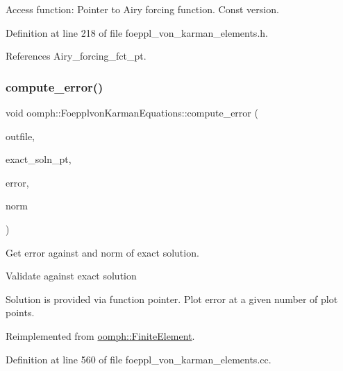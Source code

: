 Access function\+: Pointer to Airy forcing function. Const version. 



Definition at line 218 of file foeppl\+\_\+von\+\_\+karman\+\_\+elements.\+h.



References Airy\+\_\+forcing\+\_\+fct\+\_\+pt.

\mbox{\label{classoomph_1_1FoepplvonKarmanEquations_a0462a804fd89f711e219f08795af6b33}} 
\subsubsection{\texorpdfstring{compute\+\_\+error()}{compute\_error()}\hspace{0.1cm}{\footnotesize\ttfamily [1/2]}}
{\footnotesize\ttfamily void oomph\+::\+Foepplvon\+Karman\+Equations\+::compute\+\_\+error (\begin{DoxyParamCaption}\item[{std\+::ostream \&}]{outfile,  }\item[{\hyperlink{classoomph_1_1FiniteElement_a690fd33af26cc3e84f39bba6d5a85202}{Finite\+Element\+::\+Steady\+Exact\+Solution\+Fct\+Pt}}]{exact\+\_\+soln\+\_\+pt,  }\item[{double \&}]{error,  }\item[{double \&}]{norm }\end{DoxyParamCaption})\hspace{0.3cm}{\ttfamily [virtual]}}



Get error against and norm of exact solution. 

Validate against exact solution

Solution is provided via function pointer. Plot error at a given number of plot points. 

Reimplemented from \hyperlink{classoomph_1_1FiniteElement_a73c79a1f1e5b1d334757812a6bbd58ff}{oomph\+::\+Finite\+Element}.



Definition at line 560 of file foeppl\+\_\+von\+\_\+karman\+\_\+elements.\+cc.



